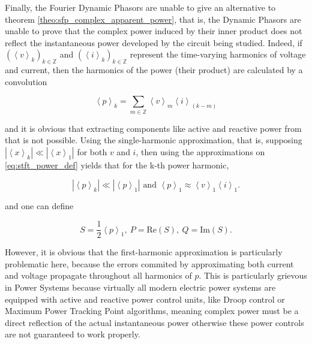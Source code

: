 	Finally, the Fourier Dynamic Phasors are unable to give an alternative to theorem \ref{theo:sfp_complex_apparent_power}, that is, the Dynamic Phasors are unable to prove that the complex power induced by their inner product does not reflect the instantaneous power developed by the circuit being studied. Indeed, if $\left(\left\langle v\right\rangle_k\right)_{k\in\mathbb{Z}}$ and $\left(\left\langle i\right\rangle_k\right)_{k\in\mathbb{Z}}$ represent the time-varying harmonics of voltage and current, then the harmonics of the power (their product) are calculated by a convolution

\begin{equation} \left\langle p\right\rangle_k = \sum_{m\in\mathbb{Z}} \left\langle v\right\rangle_m\left\langle i\right\rangle_{(k-m)} \label{eq:stft_power_def}\end{equation}

	\noindent and it is obvious that extracting components like active and reactive power from that is not possible. Using the single-harmonic approximation, that is, supposing  $\left\lvert\left\langle x\right\rangle_k\right\rvert \ll \left\lvert\left\langle x\right\rangle_1\right\rvert$ for both $v$ and $i$, then using the approximations on \eqref{eq:stft_power_def} yields that for the k-th power harmonic, 

\begin{equation} \left\lvert\left\langle p\right\rangle_k\right\rvert \ll \left\lvert\left\langle p\right\rangle_1\right\rvert \text{ and } \left\langle p\right\rangle_1 \approx \left\langle v\right\rangle_1\left\langle i\right\rangle_1 . \end{equation}

	\noindent and one can define 

\begin{equation} S = \frac{1}{2}\left\langle p\right\rangle_1,\ P = \text{Re}\left(S\right),\ Q = \text{Im}\left(S\right) .\end{equation}

	However, it is obvious that the first-harmonic approximation is particularly problematic here, because the errors commited by approximating both current and voltage propagate throughout all harmonics of $p$. This is particularly grievous in Power Systems because virtually all modern electric power systems are equipped with active and reactive power control units, like Droop control or Maximum Power Tracking Point algorithms, meaning complex power must be a direct reflection of the actual instantaneous power otherwise these power controls are not guaranteed to work properly.

